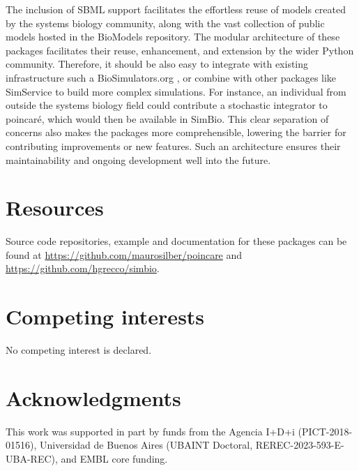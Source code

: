 \documentclass[namedate,numsec,webpdf,modern,large]{oup-authoring-template}
\theoremstyle{thmstyleone}%
\theoremstyle{thmstyletwo}%
\theoremstyle{thmstylethree}%
\begin{document}
The inclusion of \ac{SBML} support facilitates the effortless reuse of models created by the systems biology community,
along with the vast collection of public models hosted in the BioModels repository.
The modular architecture of these packages facilitates their reuse, enhancement, and extension by the wider Python community.
Therefore, it should be also easy to integrate with existing infrastructure such a BioSimulators.org \citep{shaikhBioSimulatorsCentralRegistry2022},
or combine with other packages like SimService \citep{sego_simservice_2024} to build more complex simulations.
For instance, an individual from outside the systems biology field could contribute a stochastic integrator to poincaré,
which would then be available in SimBio.
This clear separation of concerns also makes the packages more comprehensible,
lowering the barrier for contributing improvements or new features.
Such an architecture ensures their maintainability and ongoing development well into the future.

\section{Resources}\label{resources}

Source code repositories, example and documentation for these packages can be found at
\url{https://github.com/maurosilber/poincare} and
\url{https://github.com/hgrecco/simbio}.


\section{Competing interests}
No competing interest is declared.

\section{Acknowledgments}
This work was supported in part by funds from
the Agencia I+D+i (PICT-2018-01516),
Universidad de Buenos Aires (UBAINT Doctoral, REREC-2023-593-E-UBA-REC),
and EMBL core funding.



\end{document}
